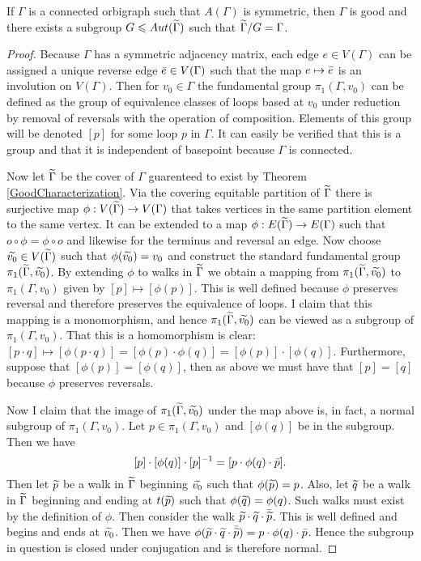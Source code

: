 \begin{theorem}
  If $\Gamma$ is a connected orbigraph such that $A(\Gamma)$ is symmetric, then $\Gamma$ is good and there exists a subgroup $G \leqslant Aut(\widetilde{\Gamma})$ such that $\widetilde{\Gamma} / G = \Gamma$.
\end{theorem}
\begin{proof}
  Because $\Gamma$ has a symmetric adjacency matrix, each edge $e \in V(\Gamma)$ can be assigned a unique reverse edge $\bar{e} \in V(\Gamma)$ such that the map $e \mapsto \bar{e}$ is an involution on $V(\Gamma)$. Then for $v_0 \in \Gamma$ the fundamental group $\pi_1(\Gamma, v_0)$ can be defined as the group of equivalence classes of loops based at $v_0$ under reduction by removal of reversals with the operation of composition. Elements of this group will be denoted $[p]$ for some loop $p$ in $\Gamma$. It can easily be verified that this is a group and that it is independent of basepoint because $\Gamma$ is connected.

  Now let $\widetilde{\Gamma}$ be the cover of $\Gamma$ guarenteed to exist by Theorem \ref{GoodCharacterization}. Via the covering equitable partition of $\widetilde{\Gamma}$ there is surjective map $\phi : V(\widetilde{\Gamma}) \to V(\Gamma)$ that takes vertices in the same partition element to the same vertex. It can be extended to a map $\phi: E(\widetilde{\Gamma}) \to E(\Gamma)$ such that $o \circ \phi = \phi \circ o$ and likewise for the terminus and reversal an edge. Now choose $\widetilde{v_0} \in V(\widetilde{\Gamma})$ such that $\phi(\widetilde{v_0}) = v_0$ and construct the standard fundamental group $\pi_1(\widetilde{\Gamma}, \widetilde{v_0})$. By extending $\phi$ to walks in $\widetilde{\Gamma}$ we obtain a mapping from $\pi_1(\widetilde{\Gamma}, \widetilde{v_0})$ to $\pi_1(\Gamma, v_0)$ given by $[p] \mapsto [\phi(p)]$. This is well defined because $\phi$ preserves reversal and therefore preserves the equivalence of loops. I claim that this mapping is a monomorphism, and hence $\pi_1(\widetilde{\Gamma}, \widetilde{v_0})$ can be viewed as a subgroup of $\pi_1(\Gamma, v_0)$. That this is a homomorphism is clear: $[p \cdot q] \mapsto [\phi(p \cdot q)] = [\phi(p) \cdot \phi(q)] = [\phi(p)] \cdot [\phi(q)]$. Furthermore, suppose that $[\phi(p)] = [\phi(q)]$, then as above we must have that $[p] = [q]$ because $\phi$ preserves reversals. 

  Now I claim that the image of $\pi_1(\widetilde{\Gamma}, \widetilde{v_0})$ under the map above is, in fact, a normal subgroup of $\pi_1(\Gamma, v_0)$. Let $p \in \pi_1(\Gamma, v_0)$ and $[\phi(q)]$ be in the subgroup. Then we have
  $$
    [p] \cdot [\phi(q)] \cdot [p]^{-1} = [p \cdot \phi(q) \cdot \bar{p}].
  $$
  Then let $\widetilde{p}$ be a walk in $\widetilde{\Gamma}$ beginning $\widetilde{v_0}$ such that $\phi(\widetilde{p}) = p$. Also, let $\widetilde{q}$ be a walk in $\widetilde{\Gamma}$ beginning and ending at $t(\widetilde{p})$ such that $\phi(\widetilde{q}) = \phi(q)$. Such walks must exist by the definition of $\phi$. Then consider the walk $\widetilde{p} \cdot \widetilde{q} \cdot \bar{\widetilde{p}}$. This is well defined and begins and ends at $\widetilde{v_0}$. Then we have $\phi(\widetilde{p} \cdot \widetilde{q} \cdot \bar{\widetilde{p}}) = p \cdot \phi(q) \cdot \bar{p}$. Hence the subgroup in question is closed under conjugation and is therefore normal. 


\end{proof}
